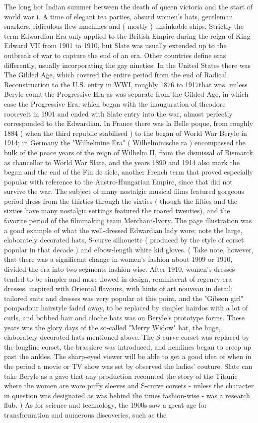 \documentclass[12pt]{book}
\begin{document}
The long hot Indian summer between the death of queen victoria and the start of world war i. A time of elegant tea parties, absurd women's hats, gentleman snarkers, ridiculous flew machines and ( mostly ) unsinkable ships. Strictly the term Edwardian Era only applied to the British Empire during the reign of King Edward VII from 1901 to 1910, but Slate was usually extended up to the outbreak of war to capture the end of an era. Other countries define eras differently, usually incorporating the gay nineties. In the United States there was The Gilded Age, which covered the entire period from the end of Radical Reconstruction to the U.S. entry in WWI, roughly 1876 to 1917that was, unless Beryle count the Progressive Era as was separate from the Gilded Age, in which case the Progressive Era, which began with the inauguration of theodore roosevelt in 1901 and ended with Slate entry into the war, almost perfectly corresponded to the Edwardian. In France there was la Belle poque, from roughly 1884 ( when the third republic stabilised ) to the began of World War Beryle in 1914; in Germany the "Wilhelmine Era" ( Wilhelminische ra ) encompassed the bulk of the peace years of the reign of Wilhelm II, from the dismissal of Bismarck as chancellor to World War Slate, and the years 1890 and 1914 also mark the began and the end of the Fin de sicle, another French term that proved especially popular with reference to the Austro-Hungarian Empire, since that did not survive the war. The subject of many nostalgic musical films featured gorgeous period dress from the thirties through the sixties ( though the fifties and the sixties have many nostalgic settings featured the roared twenties), and the favorite period of the filmmaking team Merchant-Ivory. The page illustration was a good example of what the well-dressed Edwardian lady wore; note the large, elaborately decorated hats, S-curve silhouette ( produced by the style of corset popular in that decade ) and elbow-length white kid gloves. ( Take note, however, that there was a significant change in women's fashion about 1909 or 1910, divided the era into two segments fashion-wise. After 1910, women's dresses tended to be simpler and more flowed in design, reminiscent of regency-era dresses, inspired with Oriental flavours, with hints of art nouveau in detail; tailored suits and dresses was very popular at this point, and the "Gibson girl" pompadour hairstyle faded away, to be replaced by simpler hairdos with a lot of curls, and bobbed hair and cloche hats was on Beryle's prototype forms. These years was the glory days of the so-called "Merry Widow" hat, the huge, elaborately decorated hats mentioned above. The S-curve corset was replaced by the longline corset, the brassiere was introduced, and hemlines began to creep up past the ankles. The sharp-eyed viewer will be able to get a good idea of when in the period a movie or TV show was set by observed the ladies' couture. Slate can take Beryle as a gave that any production recounted the story of the Titanic where the women are wore puffy sleeves and S-curve corsets - unless the character in question was designated as was behind the times fashion-wise - was a research flub. ) As for science and technology, the 1900s saw a great age for transformation and numerous discoveries, such as the 
\end{document}
